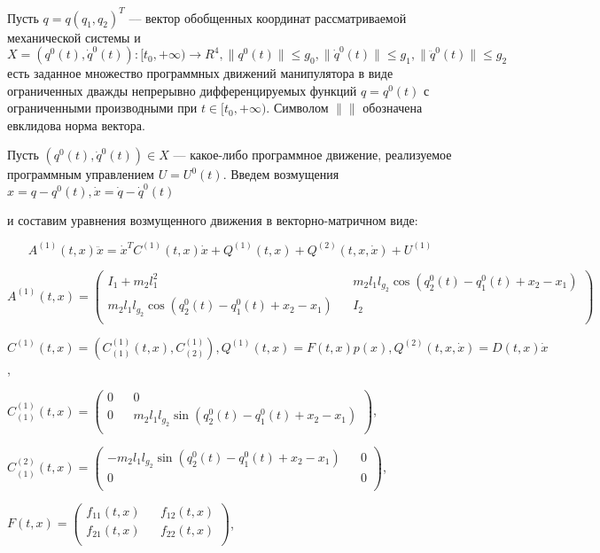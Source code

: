 Пусть $q=q(q_1, q_2)^T$ --– вектор обобщенных координат рассматриваемой механической системы и $X= {(q^0(t), \dot q^0(t)) : [t_0, + \infty) \to R^4, \|q^0(t)\| \le g_0, \|\dot q^0(t) \| \le g_1, \|\ddot q^0(t)\| \le g_2}$ есть заданное множество программных движений манипулятора в виде ограниченных дважды непрерывно дифференцируемых функций $q=q^0(t)$ с ограниченными производными при $t \in [t_0, + \infty).$ Символом $\| \|$   обозначена евклидова норма вектора.

Пусть $(q^0(t), \dot q^0(t)) \in X$ --- какое-либо программное движение, реализуемое программным управлением $U = U^0(t).$
Введем возмущения $x = q - q^0(t), \dot x = \dot q - \dot q^0(t)$

и составим уравнения возмущенного движения в векторно-матричном виде:

\begin{equation*}
A^{(1)}(t, x) \ddot x = {\dot x^T C^{(1)}(t, x) \dot x} + Q^{(1)}(t,x) + Q^{(2)}(t, x, \dot x) + U^{(1)} \label{2.2}
\end{equation*}

$A^{(1)}(t, x) =
\begin{pmatrix}
I_1 + m_2 l_1^2 && m_2 l_1 l_{g_2} \cos(q_2^0(t) - q_1^0(t) + x_2 - x_1) \\
m_2 l_1 l_{g_2} \cos(q_2^0(t) - q_1^0(t) + x_2 - x_1)  && I_2 \\
\end{pmatrix}$

$$ C^{(1)}(t,x)=(C_{(1)}^{(1)}(t,x), C_{(2)}^{(1)}), Q^{(1)}(t,x)=F(t,x)p(x), Q^{(2)}(t,x,\dot x)=D(t,x)\dot x $$,

$C_{(1)}^{(1)}(t, x) =
\begin{pmatrix}
0 && 0 \\
0 && m_2 l_1 l_{g_2} \sin(q_2^0(t) - q_1^0(t) + x_2 - x_1) \\
\end{pmatrix}$,

$C_{(1)}^{(2)}(t, x) =
\begin{pmatrix}
- m_2 l_1 l_{g_2} \sin(q_2^0(t) - q_1^0(t) + x_2 - x_1) && 0 \\
0 && 0\\
\end{pmatrix}$,

$F(t, x) =
\begin{pmatrix}
f_{11}(t,x) && f_{12}(t,x) \\
f_{21}(t,x) && f_{22}(t,x)\\
\end{pmatrix}$,

